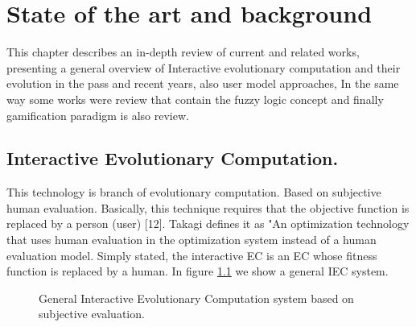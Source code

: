 \chapter{State of the art and background} \label{}
This chapter describes an in-depth review of current and related works,
presenting a general overview of Interactive evolutionary computation and their
evolution in the pass and recent years, also user model approaches, In the same
way some works were review that contain the fuzzy logic concept and finally
gamification paradigm is also review.


\section{Interactive Evolutionary Computation.}

This technology is branch of evolutionary computation. Based on subjective human
evaluation. Basically, this technique requires that the objective function is
replaced by a person (user) [12]. Takagi defines it as "An optimization
technology that uses human evaluation in the optimization system instead of a
human evaluation model. Simply stated, the interactive EC is an EC whose fitness
function is replaced by a human.  In figure \ref{fig:IEC} we show a general IEC
system.

\begin{figure}
	\captionsetup{justification=centering,margin=2cm}
	\centering
	\setlength\fboxsep{0pt}
	\setlength\fboxrule{0.7pt}
	\caption{ General Interactive Evolutionary Computation system based on subjective evaluation.}
	\label{fig:IEC}
\end{figure}




